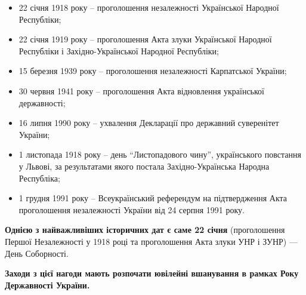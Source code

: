 \begin{itemize} %
\item 22 січня 1918 року – проголошення незалежності Української Народної Республіки;

\item 22 січня 1919 року – проголошення Акта злуки Української Народної Республіки і
Західно-Української Народної Республіки;

\item 15 березня 1939 року – проголошення незалежності Карпатської України;

\item 30 червня 1941 року – проголошення Акта відновлення української державності;

\item 16 липня 1990 року – ухвалення Декларації про державний суверенітет України;

\item 1 листопада 1918 року – день \enquote{Листопадового чину}, українського
повстання у Львові, за результатами якого постала Західно-Українська Народна
Республіка;

\item 1 грудня 1991 року – Всеукраїнський референдум на підтвердження Акта
проголошення незалежності України від 24 серпня 1991 року.
\end{itemize} %

\textbf{Однією з найважливіших історичних дат є саме 22 січня} (проголошення Першої
Незалежності у 1918 році та проголошення Акта злуки УНР і ЗУНР) — День
Соборності.

\textbf{Заходи з цієї нагоди мають розпочати ювілейні вшанування в рамках Року Державності України.}

